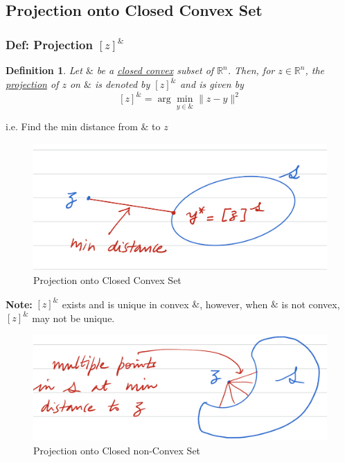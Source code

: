 \documentclass[11pt,a4paper]{article}
\newtheorem{definition}{Definition}
\begin{document}
\subsection{Projection onto Closed Convex Set}
\subsubsection{Def: Projection $[z]^\&$}
\begin{definition}
    Let $\&$ be a \underline{closed convex} subset of $\mathbb{R}^n$. Then, for $z\in \mathbb{R}^n$, the \underline{projection} of $z$ on $\&$ is denoted by $[z]^\&$ and is given by
    $$[z]^\&=\arg \min_{y\in \&}\|z-y\|^2$$
\end{definition}
i.e. Find the min distance from $\&$ to $z$
\begin{center}\begin{figure}[htbp]
    \centering
    \includegraphics[scale=0.5]{projection1.png}
    \caption{Projection onto Closed Convex Set}
    \label{}
\end{figure}\end{center}
\textbf{Note:} $[z]^\&$ exists and is unique in convex $\&$, however, when $\&$ is not convex, $[z]^\&$ may not be unique.
\begin{center}\begin{figure}[htbp]
    \centering
    \includegraphics[scale=0.5]{projection2.png}
    \caption{Projection onto Closed non-Convex Set}
    \label{}
\end{figure}\end{center}
\end{document}
